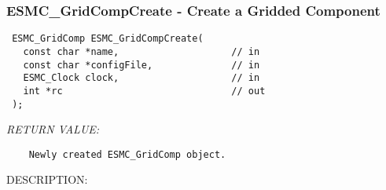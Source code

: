  
\setlength{\oldparskip}{\parskip}
\setlength{\parskip}{1.5ex}
\setlength{\oldparindent}{\parindent}
\setlength{\parindent}{0pt}
\setlength{\oldbaselineskip}{\baselineskip}
\setlength{\baselineskip}{11pt}
 
\def\bv{\begin{verbatim}}
\def\ev{\end{verbatim}}
\def\be{\begin{equation}}
\def\ee{\end{equation}}
\def\bea{\begin{eqnarray}}
\def\eea{\end{eqnarray}}
\def\bi{\begin{itemize}}
\def\ei{\end{itemize}}
\def\bn{\begin{enumerate}}
\def\en{\end{enumerate}}
\def\bd{\begin{description}}
\def\ed{\end{description}}
\def\({\left (}
\def\){\right )}
\def\[{\left [}
\def\]{\right ]}
\def\<{\left  \langle}
\def\>{\right \rangle}
\def\cI{{\cal I}}
\def\diag{\mathop{\rm diag}}
\def\tr{\mathop{\rm tr}}


 
\subsubsection [ESMC\_GridCompCreate] {ESMC\_GridCompCreate - Create a Gridded Component}


  
\begin{verbatim} ESMC_GridComp ESMC_GridCompCreate(
   const char *name,                    // in 
   const char *configFile,              // in
   ESMC_Clock clock,                    // in
   int *rc                              // out
 );\end{verbatim}{\em RETURN VALUE:}
\begin{verbatim}    Newly created ESMC_GridComp object.\end{verbatim}
{\sf DESCRIPTION:\\ }


